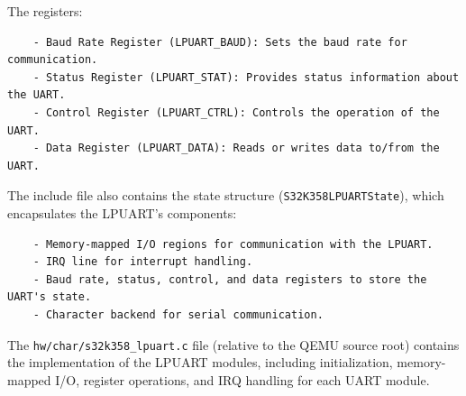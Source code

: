\vspace{0.3cm}

The registers:
\begin{verbatim}
    - Baud Rate Register (LPUART_BAUD): Sets the baud rate for communication.
    - Status Register (LPUART_STAT): Provides status information about the UART.
    - Control Register (LPUART_CTRL): Controls the operation of the UART.
    - Data Register (LPUART_DATA): Reads or writes data to/from the UART.
\end{verbatim}

\noindent The include file also contains the state structure (\texttt{S32K358LPUARTState}), which encapsulates the LPUART’s components:
\begin{verbatim}
    - Memory-mapped I/O regions for communication with the LPUART.
    - IRQ line for interrupt handling.
    - Baud rate, status, control, and data registers to store the UART's state.
    - Character backend for serial communication.
\end{verbatim}
  
\vspace{0.3cm}

\noindent The \texttt{hw/char/s32k358\_lpuart.c} file (relative to the QEMU source root) contains the implementation of the LPUART modules, including initialization, memory-mapped I/O, register operations, and IRQ handling for each UART module.

